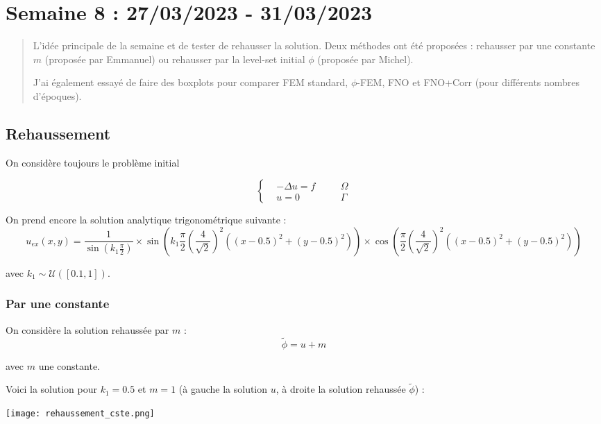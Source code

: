 \section{Semaine 8 : 27/03/2023 - 31/03/2023}
\graphicspath{{semaines/semaine_8/images/}}

\begin{abstract}
	L'idée principale de la semaine et de tester de rehausser la solution. Deux méthodes ont été proposées : rehausser par une constante $m$ (proposée par Emmanuel) ou rehausser par la level-set initial $\phi$ (proposée par Michel).
	
	J'ai également essayé de faire des boxplots pour comparer FEM standard, $\phi$-FEM, FNO et FNO+Corr (pour différents nombres d'époques).
\end{abstract}

\subsection{Rehaussement}

On considère toujours le problème initial

$$\left\{\begin{aligned}
	&-\Delta u=f \quad &&\Omega \\
	&u=0 \quad &&\Gamma
\end{aligned}\right.$$

On prend encore la solution analytique trigonométrique suivante :
$$u_{ex}(x,y) = \frac{1}{\sin\left(k_1\frac{\pi}{2}\right)}\times\sin\left(k_1\frac{\pi}{2}\left(\frac{4}{\sqrt{2}}\right)^2\left((x-0.5)^2+(y-0.5)^2\right)\right)\times\cos\left(\frac{\pi}{2}\left(\frac{4}{\sqrt{2}}\right)^2\left((x-0.5)^2+(y-0.5)^2\right)\right)$$ 

avec $k_1 \sim \mathcal{U}([0.1,1])$.

\subsubsection*{Par une constante}

On considère la solution rehaussée par $m$ :
$$\tilde{\phi}=u+m$$

avec $m$ une constante.

Voici la solution pour $k_1=0.5$ et $m=1$ (à gauche la solution $u$, à droite la solution rehaussée $\tilde{\phi}$) :

\begin{minipage}{\linewidth}
	\centering
	\texttt{[image: rehaussement\_cste.png]}
\end{minipage}

